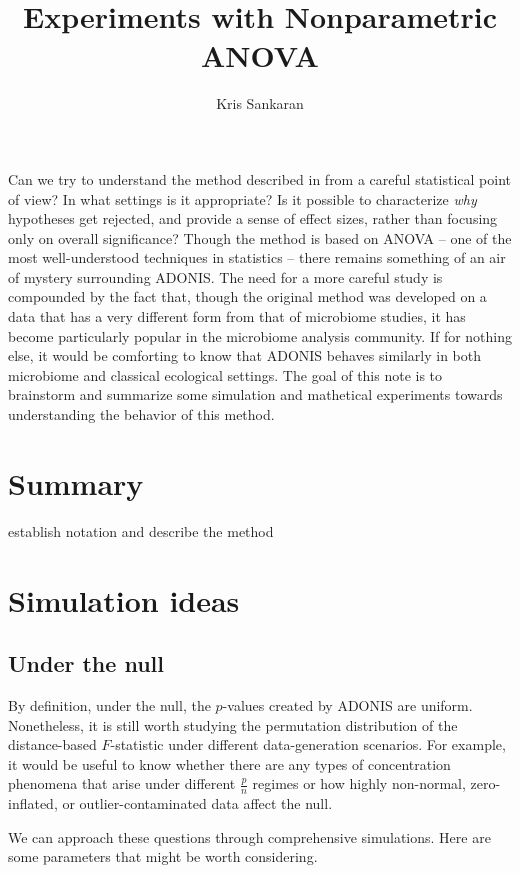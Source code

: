 \documentclass{article}
\title{Experiments with Nonparametric ANOVA}
\author{Kris Sankaran}
\begin{document}
\maketitle

Can we try to understand the method described in \citep{anderson2001new} from a
careful statistical point of view? In what settings is it appropriate? Is it
possible to characterize \textit{why} hypotheses get rejected, and provide a
sense of effect sizes, rather than focusing only on overall significance? Though
the method is based on ANOVA -- one of the most well-understood techniques in
statistics -- there remains something of an air of mystery surrounding ADONIS.
The need for a more careful study is compounded by the fact that, though the
original method was developed on a data that has a very different form from that
of microbiome studies, it has become particularly popular in the microbiome
analysis community. If for nothing else, it would be comforting to know that
ADONIS behaves similarly in both microbiome and classical ecological settings.
The goal of this note is to brainstorm and summarize some simulation and
mathetical experiments towards understanding the behavior of this method.

\section{Summary}

establish notation and describe the method

\section{Simulation ideas}

\subsection{Under the null}

By definition, under the null, the $p$-values created by ADONIS are uniform.
Nonetheless, it is still worth studying the permutation distribution of the
distance-based $F$-statistic under different data-generation scenarios. For
example, it would be useful to know whether there are any types of concentration
phenomena that arise under different $\frac{p}{n}$ regimes or how highly
non-normal, zero-inflated, or outlier-contaminated data affect the null.

We can approach these questions through comprehensive simulations. Here are some
parameters that might be worth considering.
\end{document}
